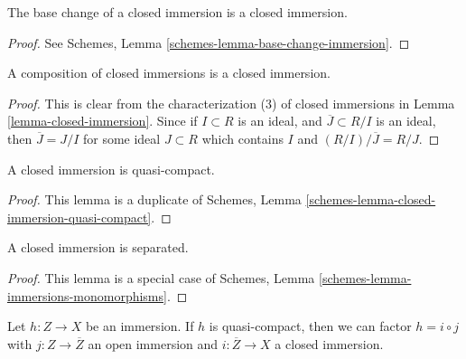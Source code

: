 \begin{lemma}
\label{lemma-base-change-closed-immersion}
The base change of a closed immersion is a closed immersion.
\end{lemma}

\begin{proof}
See Schemes, Lemma \ref{schemes-lemma-base-change-immersion}.
\end{proof}

\begin{lemma}
\label{lemma-composition-closed-immersion}
A composition of closed immersions is a closed immersion.
\end{lemma}

\begin{proof}
This is clear from the characterization (3) of closed immersions
in Lemma \ref{lemma-closed-immersion}. Since if $I \subset R$
is an ideal, and $\overline{J} \subset R/I$ is an ideal, then
$\overline{J} = J/I$ for some ideal $J \subset R$ which contains
$I$ and $(R/I)/\overline{J} = R/J$.
\end{proof}

\begin{lemma}
\label{lemma-closed-immersion-quasi-compact}
A closed immersion is quasi-compact.
\end{lemma}

\begin{proof}
This lemma is a duplicate of
Schemes, Lemma \ref{schemes-lemma-closed-immersion-quasi-compact}.
\end{proof}

\begin{lemma}
\label{lemma-closed-immersion-separated}
A closed immersion is separated.
\end{lemma}

\begin{proof}
This lemma is a special case of
Schemes, Lemma \ref{schemes-lemma-immersions-monomorphisms}.
\end{proof}

\begin{lemma}
\label{lemma-factor-quasi-compact-immersion}
Let $h : Z \to X$ be an immersion.
If $h$ is quasi-compact, then we can factor
$h = i \circ j$ with $j : Z \to \overline{Z}$ an
open immersion and $i : \overline{Z} \to X$ a closed immersion.
\end{lemma}

